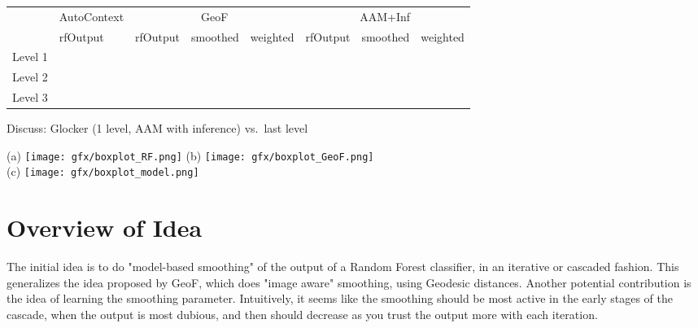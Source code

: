 \documentclass[10pt,twocolumn,letterpaper]{article}
\begin{document}
\begin{table*}[t]
\begin{center}
\begin{tabular}{l||l|lll|lll}
					& AutoContext & \multicolumn{3}{|c|}{GeoF} & \multicolumn{3}{|c}{AAM+Inf} \\
					& rfOutput & rfOutput & smoothed & weighted & rfOutput & smoothed &weighted \\
\hline
Level 1 &  &  &  &  &  &  \\
Level 2 &  &  &  &  &  & \\
Level 3 &  &  &  &  &  & \\
\hline
\end{tabular}
\caption{Evaluation on 22 datasets. median/mean(std), all 21 somites}
\label{tab:results}
\end{center}
\end{table*}

Discuss: 
Glocker (1 level, AAM with inference) vs.\ last level

\begin{figure*}[tb]
\centering
\small
\begin{center}
		(a) \texttt{[image: gfx/boxplot\_RF.png]} %
		(b) \texttt{[image: gfx/boxplot\_GeoF.png]} \\
		(c) \texttt{[image: gfx/boxplot\_model.png]} %
\end{center}
\label{boxplots}
\caption{ %
(a) 2 level cascade, RF output 
%
(b) geodesic smoothing, 1st level
%
(c) model fit}
\end{figure*}

\section{Overview of Idea}

The initial idea is to do "model-based smoothing" of the output of a Random Forest classifier, in an iterative or cascaded fashion.  This generalizes the idea proposed by GeoF, which does "image aware" smoothing, using Geodesic distances.  Another potential contribution is the idea of learning the smoothing parameter.  Intuitively, it seems like the smoothing should be most active in the early stages of the cascade, when the output is most dubious, and then should decrease as you trust the output more with each iteration.
\end{document}
